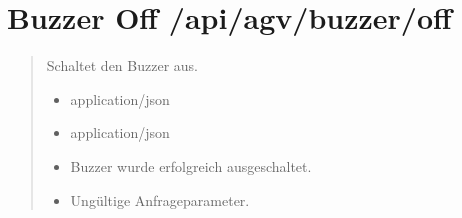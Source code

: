 \documentclass[letterpaper,10pt,english]{sphinxmanual}
\begin{document}
\section{Buzzer Off \sphinxhyphen{} /api/agv/buzzer/off}
\label{\detokenize{agv_rest_api_buzzer:buzzer-off-api-agv-buzzer-off}}\label{\detokenize{agv_rest_api_buzzer:post-api-agv-buzzer-off}}

\begin{fulllineitems}
\label{\detokenize{agv_rest_api_buzzer:post--api-agv-buzzer-off}}
\pysigstartsignatures
\pysigline
{}
\pysigstopsignatures\begin{quote}\begin{description}
\sphinxAtStartPar
Schaltet den Buzzer aus.

\begin{itemize}
\item {} 
\sphinxAtStartPar
{} \textendash{} application/json

\end{itemize}

\begin{itemize}
\item {} 
\sphinxAtStartPar
{} \textendash{} application/json

\end{itemize}

\begin{itemize}
\item {} 
\sphinxAtStartPar
{} \textendash{} Buzzer wurde erfolgreich ausgeschaltet.

\item {} 
\sphinxAtStartPar
{} \textendash{} Ungültige Anfrageparameter.

\end{itemize}

\end{description}\end{quote}

\end{fulllineitems}
\end{document}
